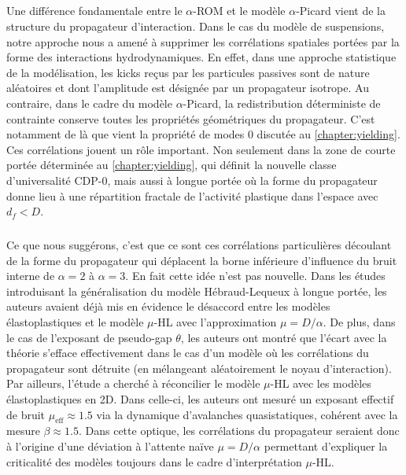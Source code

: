 \subparagraph{}Une différence fondamentale entre le $\alpha$-ROM et le modèle $\alpha$-Picard vient de la structure du propagateur d'interaction. Dans le cas du modèle de suspensions, notre approche nous a amené à supprimer les corrélations spatiales portées par la forme des interactions hydrodynamiques. En effet, dans une approche statistique de la modélisation, les kicks reçus par les particules passives sont de nature aléatoires et dont l'amplitude est désignée par un propagateur isotrope. Au contraire, dans le cadre du modèle $\alpha$-Picard, la redistribution déterministe de contrainte conserve toutes les propriétés géométriques du propagateur. C'est notamment de là que vient la propriété de modes 0 discutée au \autoref{chapter:yielding}. Ces corrélations jouent un rôle important. Non seulement dans la zone de courte portée déterminée au \autoref{chapter:yielding}, qui définit la nouvelle classe d'universalité CDP-0, mais aussi à longue portée où la forme du propagateur donne lieu à une répartition fractale de l'activité plastique dans l'espace avec $d_f < D$.

\subparagraph{}Ce que nous suggérons, c'est que ce sont ces corrélations particulières découlant de la forme du propagateur qui déplacent la borne inférieure d’influence du bruit interne de $\alpha = 2$ à $\alpha = 3$. En fait cette idée n'est pas nouvelle. Dans les études \cite{lin_mean-field_2016, lin_microscopic_2018} introduisant la généralisation du modèle Hébraud-Lequeux à longue portée, les auteurs avaient déjà mis en évidence le désaccord entre les modèles élastoplastiques et le modèle $\mu$-HL avec l'approximation $\mu = D/\alpha$. De plus, dans le cas de l'exposant de pseudo-gap $\theta$, les auteurs ont montré que l'écart avec la théorie s'efface effectivement dans le cas d'un modèle où les corrélations du propagateur sont détruite (en mélangeant aléatoirement le noyau d'interaction). Par ailleurs, l'étude \cite{ferrero_criticality_2019} a cherché à réconcilier le modèle $\mu$-HL avec les modèles élastoplastiques en 2D. Dans celle-ci, les auteurs ont mesuré un exposant effectif de bruit $\mu_\text{eff}\approx 1.5$ via la dynamique d'avalanches quasistatiques, cohérent avec la mesure $\beta \approx 1.5$. Dans cette optique, les corrélations du propagateur seraient donc à l'origine d'une déviation à l'attente naïve $\mu = D/\alpha$ permettant d'expliquer la criticalité des modèles toujours dans le cadre d'interprétation $\mu$-HL.

